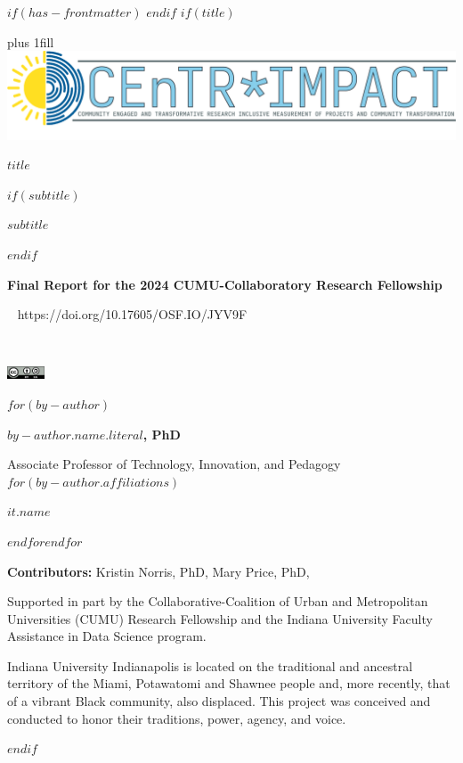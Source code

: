 $if(has-frontmatter)$
\frontmatter
$endif$
$if(title)$
\cleardoublepage
\thispagestyle{empty}
{\centering
\hbox{}\vskip 0cm plus 1fill
\includegraphics[width=6in]{centr-impact-logo.png}
{\Huge\sffamily\bfseries $title$ \par}
$if(subtitle)$
\vspace{3ex}
{\Large\sffamily\bfseries $subtitle$ \par}
$endif$
\vspace{6ex}
{\bfseries\large Final Report for the 2024 CUMU-Collaboratory Research Fellowship \par}
\vspace{3ex}
{\textcolor{doicolor}{\aiDoi} ~ https://doi.org/10.17605/OSF.IO/JYV9F \par}
{\textcolor{iucolor}{\aiOpenData} ~ ~ \textcolor{orange}{\aiOpenAccess} ~ ~ \textcolor{osfcolor}{\aiOSF} ~ ~ {\includegraphics[height=11pt]{By-SA} \par}
\vspace{12ex}
$for(by-author)$
{\Large\bfseries $by-author.name.literal$, PhD  \par}
{Associate Professor of Technology, Innovation, and Pedagogy \\}
$for(by-author.affiliations)$%
{$it.name$ \par}
$endfor$$endfor$
{\textbf{Contributors:} Kristin Norris, PhD, Mary Price, PhD, \par}
\vspace{6ex}
{\small Supported in part by the Collaborative-Coalition of Urban and Metropolitan Universities (CUMU) Research Fellowship and the Indiana University Faculty Assistance in Data Science program. \par}
\vspace{6ex}
{\small Indiana University Indianapolis is located on the traditional and ancestral territory of the Miami, Potawatomi and Shawnee people and, more recently, that of a vibrant Black community, also displaced. This project was conceived and conducted to honor their traditions, power, agency, and voice. \par}
}}
$endif$